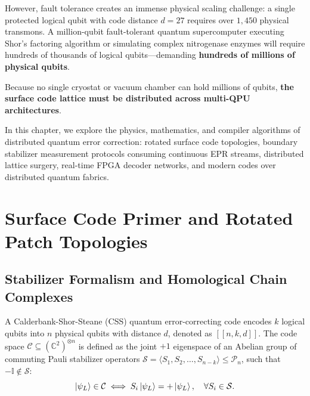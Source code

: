 However, fault tolerance creates an immense physical scaling challenge: a single protected logical qubit with code distance $d = 27$ requires over $1,450$ physical transmons. A million-qubit fault-tolerant quantum supercomputer executing Shor's factoring algorithm or simulating complex nitrogenase enzymes will require hundreds of thousands of logical qubits---demanding \textbf{hundreds of millions of physical qubits}.

Because no single cryostat or vacuum chamber can hold millions of qubits, \textbf{the surface code lattice must be distributed across multi-QPU architectures}. 

In this chapter, we explore the physics, mathematics, and compiler algorithms of distributed quantum error correction: rotated surface code topologies, boundary stabilizer measurement protocols consuming continuous EPR streams, distributed lattice surgery, real-time FPGA decoder networks, and modern  codes over distributed quantum fabrics.

\section{Surface Code Primer and Rotated Patch Topologies}
\label{sec:surface_code_primer}

\subsection{Stabilizer Formalism and Homological Chain Complexes}
A Calderbank-Shor-Steane (CSS) quantum error-correcting code encodes $k$ logical qubits into $n$ physical qubits with distance $d$, denoted as $[[n, k, d]]$. The code space $\mathcal{C} \subseteq (\mathbb{C}^2)^{\otimes n}$ is defined as the joint $+1$ eigenspace of an Abelian group of commuting Pauli stabilizer operators $\mathcal{S} = \langle S_1, S_2, \dots, S_{n-k} \rangle \le \mathcal{P}_n$, such that $-\mathbb{I} \notin \mathcal{S}$:
\begin{equation}
    \ket{\psi_L} \in \mathcal{C} \iff S_i \ket{\psi_L} = +\ket{\psi_L}, \quad \forall S_i \in \mathcal{S}.
    \label{eq:stabilizer_eigenspace_ch13}
\end{equation}

